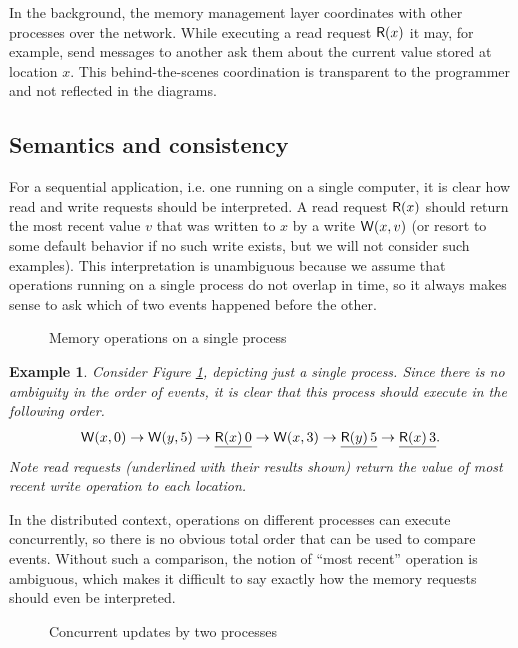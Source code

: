 \documentclass[]             %
{NASA}                       %
\newtheorem{example}{Example}
\theoremstyle{definition}
\begin{document}
In the background, the memory management layer coordinates with other
processes over the network. While executing a read request $\mathsf{R}\!\left(x\right)$ it
may, for example, send messages to another ask them about the current
value stored at location $x$. This behind-the-scenes coordination is
transparent to the programmer and not reflected in the diagrams.

\subsection{Semantics and consistency}

For a sequential application, i.e. one running on a single computer,
it is clear how read and write requests should be interpreted. A read
request $\mathsf{R}\!\left(x\right)$ should return the most recent value $v$ that was
written to $x$ by a write $\mathsf{W}\!\left(x, v\right)$ (or resort to some default
behavior if no such write exists, but we will not consider such
examples). This interpretation is unambiguous because we assume that
operations running on a single process do not overlap in time, so it
always makes sense to ask which of two events happened before the
other.
\begin{figure}
  
  \caption{Memory operations on a single process}
  \label{fig:smEx0}
\end{figure}

\begin{example}
  \label{exmpl:updatesoneprocess}
  Consider Figure \ref{fig:smEx0}, depicting just a single
  process. Since there is no ambiguity in the order of events, it is
  clear that this process should execute in the following order.
  \[ \mathsf{W}\!\left(x, 0\right) \to \mathsf{W}\!\left(y, 5\right) \to \underline{\mathsf{R}\!\left(x\right){0}} \to \mathsf{W}\!\left(x, 3\right) \to \underline{\mathsf{R}\!\left(y\right){5}} \to \underline{\mathsf{R}\!\left(x\right){3}}. \]
  Note read requests (underlined with their results shown) return the value of most recent write operation to each location.
\end{example}

In the distributed context, operations on different processes can
execute concurrently, so there is no obvious total order that can be
used to compare events. Without such a comparison, the notion of
``most recent'' operation is ambiguous, which makes it difficult to
say exactly how the memory requests should even be interpreted.

\begin{figure}
  
  \caption{Concurrent updates by two processes}
  \label{fig:smEx2}
\end{figure}
\end{document}
